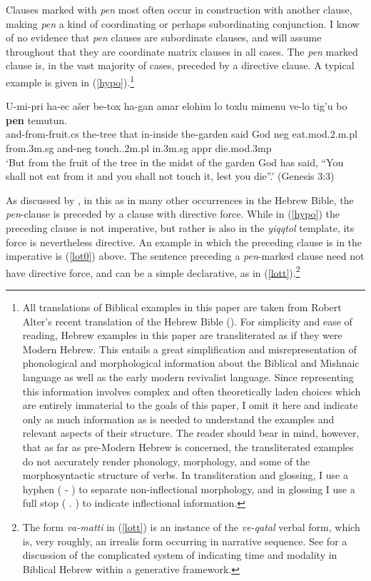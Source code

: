 \documentclass[output=paper,colorlinks,citecolor=brown]{langscibook}
\begin{document}
Clauses marked with \textit{pen} most often occur in construction with another clause, making \textit{pen} a kind of coordinating or perhaps subordinating conjunction. I know of no evidence that \textit{pen} clauses are subordinate clauses, and will assume throughout that they are coordinate matrix clauses in all cases. The \textit{pen} marked clause is, in the vast majority of cases, preceded by a directive clause. A typical example is given in (\ref{hypo}).\footnote{All translations of Biblical examples in this paper are taken from Robert Alter's recent translation of the Hebrew Bible (\citealt{alter18}). For simplicity and ease of reading, Hebrew examples in this paper are transliterated as if they were Modern Hebrew. This entails a great simplification and misrepresentation of phonological and morphological information about the Biblical and Mishnaic language as well as the early modern revivalist language. Since representing this information involves complex and often theoretically laden choices which are entirely immaterial to the goals of this paper, I omit it here and indicate only as much information as is needed to understand the examples and relevant aspects of their structure. The reader should bear in mind, however, that as far as pre-Modern Hebrew is concerned, the transliterated examples do not accurately render phonology, morphology, and some of the morphosyntactic structure of verbs. In transliteration and glossing, I use a hyphen ( - ) to separate non-inflectional morphology, and in glossing I use a full stop ( . )  to indicate inflectional information.}

\ea
\label{hypo} 
\gll U-mi-pri ha-ec ašer be-tox ha-gan amar elohim lo toxlu mimenu ve-lo tig'u bo \textbf{pen} temutun. \\
and-from-fruit.{\sc cs} the-tree that in-inside the-garden said God {\sc neg} eat.{\sc mod.2.m.pl} from.{\sc 3m.sg} and-{\sc neg} touch..2{\sc m.pl} in.{\sc 3m.sg} {\sc appr} die.{\sc mod.3mp} \\
\glt `But from the fruit of the tree in the midst of the garden God has said, ``You shall not eat from it and you shall not touch it, lest you die''.' (Genesis 3:3)
\z 

As discussed by \citet{azar81}, in this as in many other occurrences in the Hebrew Bible, the \textit{pen}-clause is preceded by a clause with directive force. While in (\ref{hypo}) the preceding clause is not imperative, but rather is also in the \textit{yiqqtol} template, its force is nevertheless directive. An example in which the preceding clause is in the imperative is (\ref{lot0}) above. The sentence preceding a \textit{pen}-marked clause need not have directive force, and can be a simple declarative, as in (\ref{lott}).\footnote{The form \textit{va-matti} in (\ref{lott}) is an instance of the \textit{ve-qatal} verbal form, which is, very roughly, an irrealis form occurring in narrative sequence. See \citet{hatav-book} for a discussion of the complicated system of indicating time and modality in Biblical Hebrew within a generative framework.}
\end{document}
